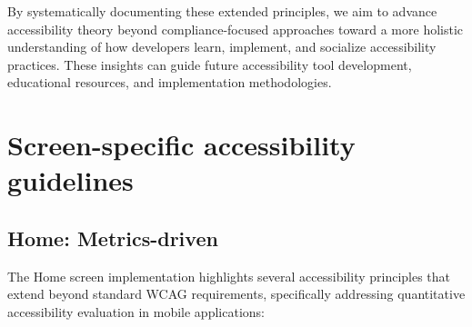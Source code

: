 By systematically documenting these extended principles, we aim to advance accessibility theory beyond compliance-focused approaches toward a more holistic understanding of how developers learn, implement, and socialize accessibility practices. These insights can guide future accessibility tool development, educational resources, and implementation methodologies.

\section{Screen-specific accessibility guidelines}
\label{sec:screen-specific-principles}

\subsection{Home: Metrics-driven}

The Home screen implementation highlights several accessibility principles that extend beyond standard WCAG requirements, specifically addressing quantitative accessibility evaluation in mobile applications:

